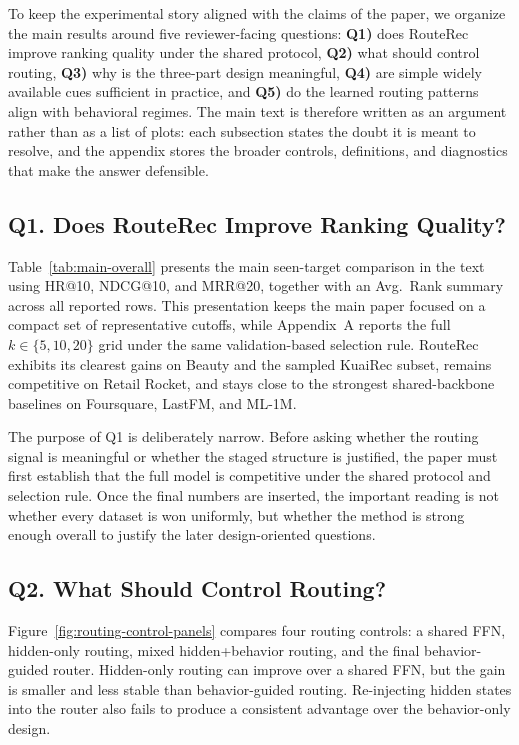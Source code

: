 \documentclass[sigconf,review,anonymous]{acmart}
\begin{document}
To keep the experimental story aligned with the claims of the paper, we organize the main results around five reviewer-facing questions: \textbf{Q1)} does RouteRec improve ranking quality under the shared protocol, \textbf{Q2)} what should control routing, \textbf{Q3)} why is the three-part design meaningful, \textbf{Q4)} are simple widely available cues sufficient in practice, and \textbf{Q5)} do the learned routing patterns align with behavioral regimes. The main text is therefore written as an argument rather than as a list of plots: each subsection states the doubt it is meant to resolve, and the appendix stores the broader controls, definitions, and diagnostics that make the answer defensible.

\subsection{Q1. Does RouteRec Improve Ranking Quality?}
\label{sec:overall-performance}
Table~\ref{tab:main-overall} presents the main seen-target comparison in the text using HR@10, NDCG@10, and MRR@20, together with an Avg.~Rank summary across all reported rows. This presentation keeps the main paper focused on a compact set of representative cutoffs, while Appendix~A reports the full $k\in\{5,10,20\}$ grid under the same validation-based selection rule. RouteRec exhibits its clearest gains on Beauty and the sampled KuaiRec subset, remains competitive on Retail Rocket, and stays close to the strongest shared-backbone baselines on Foursquare, LastFM, and ML-1M.

The purpose of Q1 is deliberately narrow. Before asking whether the routing signal is meaningful or whether the staged structure is justified, the paper must first establish that the full model is competitive under the shared protocol and selection rule. Once the final numbers are inserted, the important reading is not whether every dataset is won uniformly, but whether the method is strong enough overall to justify the later design-oriented questions.

\subsection{Q2. What Should Control Routing?}
\label{sec:routing-control}
Figure~\ref{fig:routing-control-panels} compares four routing controls: a shared FFN, hidden-only routing, mixed hidden+behavior routing, and the final behavior-guided router. Hidden-only routing can improve over a shared FFN, but the gain is smaller and less stable than behavior-guided routing. Re-injecting hidden states into the router also fails to produce a consistent advantage over the behavior-only design.
\end{document}
